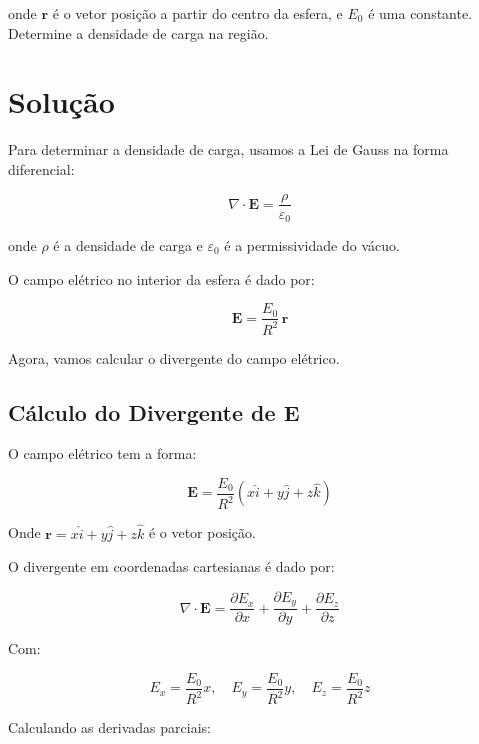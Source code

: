\documentclass[a4paper,12pt]{article}
\begin{document}
\begin{flushleft}
onde \( \mathbf{r} \) é o vetor posição a partir do centro da esfera, e \( E_0 \) é uma constante. Determine a densidade de carga na região.

\section*{Solução}

Para determinar a densidade de carga, usamos a Lei de Gauss na forma diferencial:

\begin{equation}
\boxed{\nabla \cdot \mathbf{E} = \frac{\rho}{\varepsilon_0}}
\end{equation}

onde \( \rho \) é a densidade de carga e \( \varepsilon_0 \) é a permissividade do vácuo.

O campo elétrico no interior da esfera é dado por:

\begin{equation}
\mathbf{E} = \frac{E_0}{R^2} \, \mathbf{r}
\end{equation}

Agora, vamos calcular o divergente do campo elétrico.

\subsection*{Cálculo do Divergente de \( \mathbf{E} \)}

O campo elétrico tem a forma:

\begin{equation}
\mathbf{E} = \frac{E_0}{R^2} (x \hat{i} + y \hat{j} + z \hat{k})
\end{equation}

Onde \( \mathbf{r} = x \hat{i} + y \hat{j} + z \hat{k} \) é o vetor posição.

O divergente em coordenadas cartesianas é dado por:

\begin{equation}
\nabla \cdot \mathbf{E} = \frac{\partial E_x}{\partial x} + \frac{\partial E_y}{\partial y} + \frac{\partial E_z}{\partial z}
\end{equation}

Com:

\begin{equation}
E_x = \frac{E_0}{R^2} x, \quad E_y = \frac{E_0}{R^2} y, \quad E_z = \frac{E_0}{R^2} z
\end{equation}

Calculando as derivadas parciais:


\end{flushleft}
\end{document}
